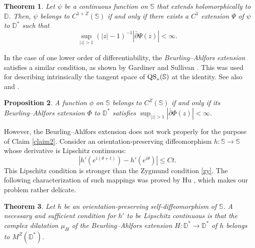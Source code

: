 \documentclass[amstex]{amsart}
\newtheorem{theorem}{Theorem}[section]
\newtheorem{proposition}[theorem]{Proposition}
\theoremstyle{definition}
\theoremstyle{remark}
\numberwithin{equation}{section}
\begin{document}
\begin{theorem}\label{pseudoanalytic}
Let $\psi$ be a continuous function on $\mathbb S$ that extends holomorphically to $\mathbb D$.
Then, 
$\psi$ belongs to $C^{1+Z}(\mathbb S)$ 
if and only if there exists a $C^1$ extension $\Psi$ of $\psi$ to $\mathbb D^*$ such that
$$
\sup_{|z|>1} (|z|-1)^{-1}|\bar\partial \Psi(z)| < \infty.
$$
\end{theorem}

In the case of one lower order of differentiability, 
the {\it Beurling--Ahlfors extension} \cite{BA} satisfies a similar condition, 
as shown by Gardiner and Sullivan \cite[p.~733]{GS}.
This was used for describing intrinsically the tangent space of ${\rm QS}_*(\mathbb S)$ at the identity.
See also \cite{GH} and \cite{nag}.

\begin{proposition}\label{BACZ}
A function $\phi$ on $\mathbb S$ belongs to $C^Z(\mathbb S)$ 
if and only if its Beurling--Ahlfors extension $\Phi$ to $\mathbb D^*$ satisfies
$
\sup_{|z|>1} |\bar\partial \Phi(z)| < \infty.
$
\end{proposition}

However, the Beurling--Ahlfors extension does not work properly
for the purpose of Claim \ref{claim2}. 
Consider an orientation-preserving diffeo\-morphism $h:\mathbb S \to \mathbb S$ whose derivative is Lipschitz continuous:
$$
|h'(e^{i(\theta+t)}) - h'(e^{i\theta})| \leq Ct.
$$ 
This Lipschitz condition is stronger than the Zygmund condition \eqref{zy}.
The following characterization of such mappings was proved by Hu \cite[Theorem 10]{Hu},
which makes our problem rather delicate.

\begin{theorem}\label{junhu}
Let $h$ be an orientation-preserving self-diffeo\-mor\-phism of $\mathbb S$.
A necessary and sufficient condition for $h'$ to be Lipschitz continuous is that the complex dilatation $\mu_H$ 
of the Beurling--Ahlfors extension $H:\mathbb D^* \to \mathbb D^*$ of $h$ belongs to $M^Z(\mathbb D^*)$.
\end{theorem}
\end{document}
